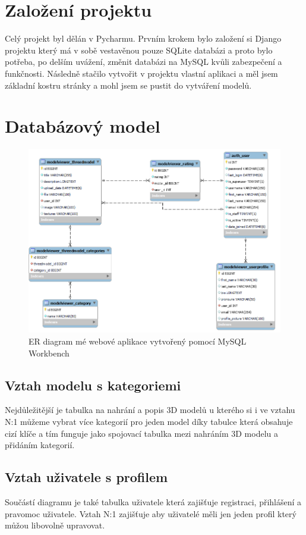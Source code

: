 \documentclass[12pt, a4paper,
twoside,        %
openright
]{report}
\begin{document}
	\section[Založení projektu]{Založení projektu}
	Celý projekt byl dělán v Pycharmu. Prvním krokem bylo založení si Django projektu který má v sobě vestavěnou pouze SQLite databázi a proto bylo potřeba, po delším uvážení, změnit databázi na MySQL kvůli zabezpečení a funkčnosti. Následně stačilo vytvořit v projektu vlastní aplikaci a měl jsem základní kostru stránky a mohl jsem se pustit do vytváření modelů.
	\section[Databázový model]{Databázový model}
		\begin{figure}[h]
			\centering
			\includegraphics[width=0.9\linewidth]{image/mvt-model.png} 
			\caption{ER diagram mé webové aplikace vytvořený pomocí MySQL Workbench}
		\end{figure}
		\clearpage
		\subsection[Vztah modelu s kategoriemi]{Vztah modelu s kategoriemi} Nejdůležitější je tabulka na nahrání a popis 3D modelů u kterého si i ve vztahu N:1 můžeme vybrat více kategorií pro jeden model díky tabulce která obsahuje cizí klíče a tím funguje jako spojovací tabulka mezi nahráním 3D modelu a přidáním kategorií.
		\subsection[Vztah uživatele s profilem]{Vztah uživatele s profilem}
		Součástí diagramu je také tabulka uživatele která zajišťuje registraci, přihlášení a pravomoc uživatele. Vztah N:1 zajišťuje aby uživatelé měli jen jeden profil který můžou libovolně upravovat.
\end{document}
